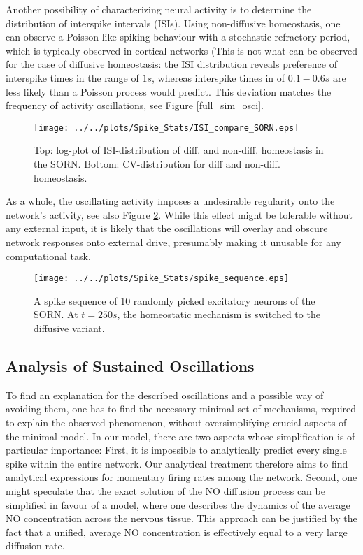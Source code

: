\documentclass[10pt,a4paper]{article}
\begin{document}
Another possibility of characterizing neural activity is to determine the distribution of interspike intervals (ISIs). Using non-diffusive homeostasis, one can observe a Poisson-like spiking behaviour with a stochastic refractory period, which is typically observed in cortical networks (This is not what can be observed for the case of diffusive homeostasis: the ISI distribution reveals preference of interspike times in the range of $1s$, whereas interspike times in of $0.1-0.6s$ are less likely than a Poisson process would predict. This deviation matches the frequency of activity oscillations, see Figure \ref{full_sim_osci}.
\begin{figure}
\texttt{[image: ../../plots/Spike\_Stats/ISI\_compare\_SORN.eps]}
\caption{Top: log-plot of ISI-distribution of diff. and non-diff. homeostasis in the SORN. Bottom: CV-distribution for diff and non-diff. homeostasis.}
\label{ISI_compare}
\end{figure}

As a whole, the oscillating activity imposes a undesirable regularity onto the network's activity, see also Figure \ref{spike_sequence}. While this effect might be tolerable without any external input, it is likely that the oscillations will overlay and obscure network responses onto external drive, presumably making it unusable for any computational task.
\begin{figure}
\texttt{[image: ../../plots/Spike\_Stats/spike\_sequence.eps]}
\caption{A spike sequence of 10 randomly picked excitatory neurons of the SORN. At $t=250s$, the homeostatic mechanism is switched to the diffusive variant.}
\label{spike_sequence}
\end{figure}

\subsection{Analysis of Sustained Oscillations}\label{theor_osc}

To find an explanation for the described oscillations and a possible way of avoiding them, one has to find the necessary minimal set of mechanisms, required to explain the observed phenomenon, without oversimplifying crucial aspects of the minimal model. In our model, there are two aspects whose simplification is of particular importance: First, it is impossible to analytically predict every single spike within the entire network. Our analytical treatment therefore aims to find analytical expressions for momentary firing rates among the network. Second, one might speculate that the exact solution of the NO diffusion process can be simplified in favour of a model, where one describes the dynamics of the average NO concentration across the nervous tissue. This approach can be justified by the fact that a unified, average NO concentration is effectively equal to a very large diffusion rate.
\end{document}
